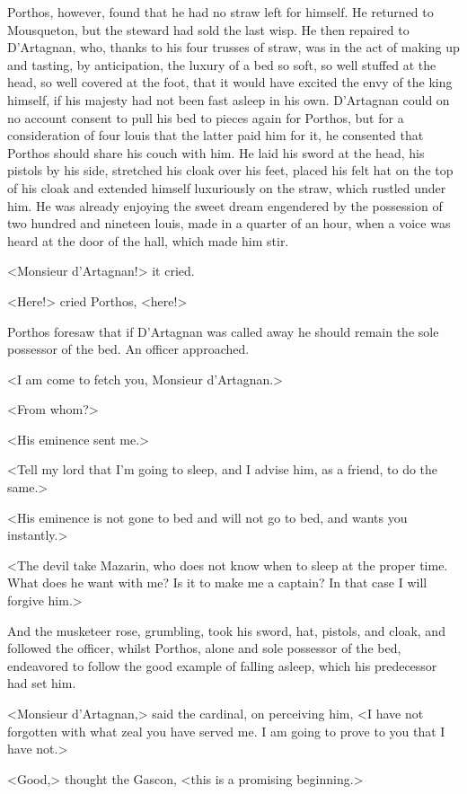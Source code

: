 Porthos, however, found that he had no straw left for himself. He returned to Mousqueton, but the steward had sold the last wisp. He then repaired to D'Artagnan, who, thanks to his four trusses of straw, was in the act of making up and tasting, by anticipation, the luxury of a bed so soft, so well stuffed at the head, so well covered at the foot, that it would have excited the envy of the king himself, if his majesty had not been fast asleep in his own. D'Artagnan could on no account consent to pull his bed to pieces again for Porthos, but for a consideration of four louis that the latter paid him for it, he consented that Porthos should share his couch with him. He laid his sword at the head, his pistols by his side, stretched his cloak over his feet, placed his felt hat on the top of his cloak and extended himself luxuriously on the straw, which rustled under him. He was already enjoying the sweet dream engendered by the possession of two hundred and nineteen louis, made in a quarter of an hour, when a voice was heard at the door of the hall, which made him stir.

<Monsieur d'Artagnan!> it cried.

<Here!> cried Porthos, <here!>

Porthos foresaw that if D'Artagnan was called away he should remain the sole possessor of the bed. An officer approached.

<I am come to fetch you, Monsieur d'Artagnan.>

<From whom?>

<His eminence sent me.>

<Tell my lord that I'm going to sleep, and I advise him, as a friend, to do the same.>

<His eminence is not gone to bed and will not go to bed, and wants you instantly.>

<The devil take Mazarin, who does not know when to sleep at the proper time. What does he want with me? Is it to make me a captain? In that case I will forgive him.>

And the musketeer rose, grumbling, took his sword, hat, pistols, and cloak, and followed the officer, whilst Porthos, alone and sole possessor of the bed, endeavored to follow the good example of falling asleep, which his predecessor had set him.

<Monsieur d'Artagnan,> said the cardinal, on perceiving him, <I have not forgotten with what zeal you have served me. I am going to prove to you that I have not.>

<Good,> thought the Gascon, <this is a promising beginning.>

